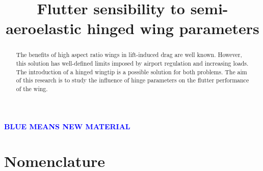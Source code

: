 \documentclass[conference]{IEEEtran}
\begin{document}
%
\title{Flutter sensibility to semi-aeroelastic hinged wing parameters}

% 
\author{
}




\maketitle

\textcolor{blue}{\textbf{BLUE MEANS NEW MATERIAL}}


\begin{abstract}
The benefits of high aspect ratio wings in lift-induced drag are well known. However, this solution has well-defined limits imposed by airport regulation and increasing loads. The introduction of a hinged wingtip is a possible solution for both problems. The aim of this research is to study the influence of hinge parameters on the flutter performance of the wing.
\end{abstract}

\IEEEpeerreviewmaketitle

\section*{Nomenclature}
\end{document}

